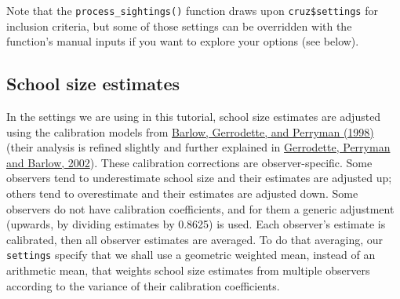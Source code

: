 \documentclass[
]{book}
\newenvironment{Shaded}{\begin{snugshade}}{\end{snugshade}}
\newcommand{\DecValTok}[1]{\textcolor[rgb]{0.00,0.00,0.81}{#1}}
\newcommand{\NormalTok}[1]{#1}
\newcommand{\OperatorTok}[1]{\textcolor[rgb]{0.81,0.36,0.00}{\textbf{#1}}}
\newcommand{\OtherTok}[1]{\textcolor[rgb]{0.56,0.35,0.01}{#1}}
\newcommand{\StringTok}[1]{\textcolor[rgb]{0.31,0.60,0.02}{#1}}
\begin{document}
\begin{Shaded}
\begin{Highlighting}[]
{\OperatorTok{$}\StringTok{ }\NormalTok{n_best           }\OperatorTok{<}\NormalTok{int}\OperatorTok{>}\StringTok{ }\DecValTok{3}\NormalTok{, }\DecValTok{3}\NormalTok{, }\DecValTok{0}\NormalTok{, }\DecValTok{2}\NormalTok{, }\DecValTok{1}
\OperatorTok{$}\StringTok{ }\NormalTok{n_low            }\OperatorTok{<}\NormalTok{int}\OperatorTok{>}\StringTok{ }\DecValTok{3}\NormalTok{, }\DecValTok{3}\NormalTok{, }\DecValTok{0}\NormalTok{, }\DecValTok{2}\NormalTok{, }\DecValTok{1}
\OperatorTok{$}\StringTok{ }\NormalTok{n_high           }\OperatorTok{<}\NormalTok{int}\OperatorTok{>}\StringTok{ }\DecValTok{3}\NormalTok{, }\DecValTok{3}\NormalTok{, }\DecValTok{0}\NormalTok{, }\DecValTok{2}\NormalTok{, }\DecValTok{1}
\OperatorTok{$}\StringTok{ }\NormalTok{calibr           }\OperatorTok{<}\NormalTok{lgl}\OperatorTok{>}\StringTok{ }\OtherTok{TRUE}\NormalTok{, }\OtherTok{TRUE}\NormalTok{, }\OtherTok{TRUE}\NormalTok{, }\OtherTok{TRUE}\NormalTok{, }\OtherTok{TRUE}
\OperatorTok{$}\StringTok{ }\NormalTok{included         }\OperatorTok{<}\NormalTok{lgl}\OperatorTok{>}\StringTok{ }\OtherTok{TRUE}\NormalTok{, }\OtherTok{TRUE}\NormalTok{, }\OtherTok{TRUE}\NormalTok{, }\OtherTok{TRUE}\NormalTok{, }\OtherTok{TRUE}
\end{Highlighting}
\end{Shaded}

Note that the \texttt{process\_sightings()} function draws upon \texttt{cruz\$settings} for inclusion criteria, but some of those settings can be overridden with the function's manual inputs if you want to explore your options (see below).

\hypertarget{ss_calibration}{%
\subsection*{School size estimates}\label{ss_calibration}}

In the settings we are using in this tutorial, school size estimates are adjusted using the calibration models from \href{https://scholar.google.com/scholar?hl=en\&as_sdt=0\%2C43\&q=barlow+1998+group+size+caliration\&btnG=}{Barlow, Gerrodette, and Perryman (1998)} (their analysis is refined slightly and further explained in \href{https://scholar.google.com/scholar?hl=en\&as_sdt=0\%2C43\&q=barlow+1998+group+size+caliration\&btnG=}{Gerrodette, Perryman and Barlow, 2002}). These calibration corrections are observer-specific. Some observers tend to underestimate school size and their estimates are adjusted up; others tend to overestimate and their estimates are adjusted down. Some observers do not have calibration coefficients, and for them a generic adjustment (upwards, by dividing estimates by 0.8625) is used. Each observer's estimate is calibrated, then all observer estimates are averaged. To do that averaging, our \texttt{settings} specify that we shall use a geometric weighted mean, instead of an arithmetic mean, that weights school size estimates from multiple observers according to the variance of their calibration coefficients.
\end{document}
